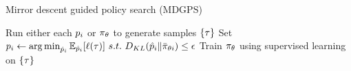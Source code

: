 
\setlength{\textfloatsep}{12pt}
\begin{algorithm}[tb]
    \caption{Mirror descent guided policy search (MDGPS)}
    \label{alg:mdgps}
    \begin{algorithmic}[1]
            \STATE Run either each $p_i$ or $\pi_{\theta}$ to
            generate samples $\{\tau\}$
            \STATE Set
            $p_i\leftarrow\operatorname*{arg\,min}_{\hat{p}_i}\mathbb{E}_{\hat{p}_i}[\ell(\tau)]~s.t.~D_{KL}(\hat{p}_i\|\bar{\pi}_{\theta{i}})\leq\epsilon$
            \STATE Train $\pi_{\theta}$ using supervised learning on
            $\{\tau\}$
        \ENDFOR
    \end{algorithmic}
\end{algorithm}



